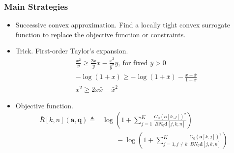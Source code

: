 \documentclass[handout,11.5pt]{beamer}
\begin{document}
\begin{frame}
\frametitle{Main Strategies}
	\begin{itemize}
		\item<1-> \alert{Successive convex approximation.} Find a locally tight convex surrogate function to replace the objective function or constraints.
		\item<2-> Trick. \alert{First-order Taylor's expansion.}
		\begin{subequations}
			\begin{flalign*}
			&\frac{x^2}{y} \geq \frac{2\bar{x}}{\bar{y}}x-\frac{\bar{x}^2}{\bar{y}^2}y,\ \text{for fixed }\bar{y}>0 \\
			&-\log(1+x) \geq -\log(1+\bar{x}) - \frac{x-\bar{x}}{1+\bar{x}} \\
			&x^2 \geq 2x\bar{x}-\bar{x}^2
			\end{flalign*}
		\end{subequations}
		\item<3-> Objective function. 
		\begin{equation}\label{obj2}
			\begin{array}{rl}
				\overline{R}[k,n](\boldsymbol{a},\boldsymbol{q}) \triangleq & \log\left(1+\sum_{j=1}^K\frac{G_0(\boldsymbol{a}[k,j])^2}{BN_0\boldsymbol{d}[j,k,n]}\right)\\
				&\qquad-\log\left(1+\sum_{j=1,j\ne k}^K\frac{G_0(\boldsymbol{a}[k,j])^2}{BN_0\boldsymbol{d}[j,k,n]}\right)
			\end{array}
		\end{equation}
	\end{itemize}
\end{frame}
\end{document}
